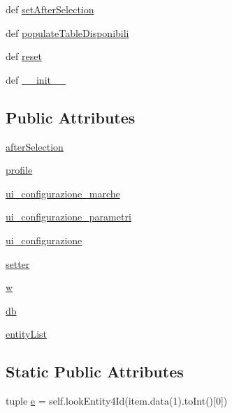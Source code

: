 \begin{DoxyCompactItemize}
\item 
def \hyperlink{classmmasgis_1_1esportazione_1_1MainWindowEsportazione_a95e7166866855cfef994779d7f9492a7}{setAfterSelection}
\item 
def \hyperlink{classmmasgis_1_1esportazione_1_1MainWindowEsportazione_a0faa98f7f4fa97959f663aef54825428}{populateTableDisponibili}
\item 
def \hyperlink{classmmasgis_1_1esportazione_1_1MainWindowEsportazione_a0537d0eebc69f00e1f19010f400c8b3b}{reset}
\item 
def \hyperlink{classmmasgis_1_1esportazione_1_1MainWindowEsportazione_a4f6b437b73177a3322d7d315782b1ab4}{\_\-\_\-init\_\-\_\-}
\end{DoxyCompactItemize}
\subsection*{Public Attributes}
\begin{DoxyCompactItemize}
\item 
\hyperlink{classmmasgis_1_1esportazione_1_1MainWindowEsportazione_af64a8c9197b5b01af6653a51a313010c}{afterSelection}
\item 
\hyperlink{classmmasgis_1_1esportazione_1_1MainWindowEsportazione_ad616a1d6184520f42edbbf4bb8743764}{profile}
\item 
\hyperlink{classmmasgis_1_1esportazione_1_1MainWindowEsportazione_af73f32812b30fed32784837e0b428253}{ui\_\-configurazione\_\-marche}
\item 
\hyperlink{classmmasgis_1_1esportazione_1_1MainWindowEsportazione_a2a629968c919a61127663d7c9060aa1c}{ui\_\-configurazione\_\-parametri}
\item 
\hyperlink{classmmasgis_1_1esportazione_1_1MainWindowEsportazione_aa7ab77eef971d57a267340023f1b1efa}{ui\_\-configurazione}
\item 
\hyperlink{classmmasgis_1_1esportazione_1_1MainWindowEsportazione_a893f776d91181619785ba7dff6eacc83}{setter}
\item 
\hyperlink{classmmasgis_1_1esportazione_1_1MainWindowEsportazione_ad47aee177a33770336a42cbd624bd62d}{w}
\item 
\hyperlink{classmmasgis_1_1esportazione_1_1MainWindowEsportazione_aafce641ba590d092e8e0d9ce68ff499a}{db}
\item 
\hyperlink{classmmasgis_1_1esportazione_1_1MainWindowEsportazione_a904f2985bf3a9feb668057cd694a8686}{entityList}
\end{DoxyCompactItemize}
\subsection*{Static Public Attributes}
\begin{DoxyCompactItemize}
\item 
tuple \hyperlink{classmmasgis_1_1esportazione_1_1MainWindowEsportazione_a46fa8fe2e7557ba3143877a865c289d9}{e} = self.lookEntity4Id(item.data(1).toInt()\mbox{[}0\mbox{]})
\end{DoxyCompactItemize}


